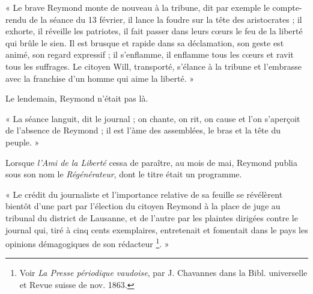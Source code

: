 \documentclass[french,twoside]{book} %
\newenvironment{quoteblock}%
  {\begin{quoting}}
  {\end{quoting}}
\newenvironment{quotebar}{%
    \def\FrameCommand{{\color{rubric!10!}\vrule width 0.5em} \hspace{0.9em}}%
    \def\OuterFrameSep{\itemsep} %
    \MakeFramed {\advance\hsize-\width \FrameRestore}
  }%
  {%
    \endMakeFramed
  }
\renewenvironment{quoteblock}%
  {%
    \savenotes
    \setstretch{0.9}
    \begin{quotebar}
  }
  {%
    \end{quotebar}
    \spewnotes
  }
\begin{document}
\begin{quoteblock}
\noindent « Le brave Reymond monte de nouveau à la tribune, dit par exemple le compte-rendu de la séance du 13 février, il lance la foudre sur la tête des aristocrates ; il exhorte, il réveille les patriotes, il fait passer dans leurs cœurs le feu de la liberté qui brûle le sien. Il est brusque et rapide dans sa déclamation, son geste est animé, son regard expressif ; il s’enflamme, il enflamme tous les cœurs et ravit tous les suffrages. Le citoyen Will, transporté, s’élance à la tribune et l’embrasse avec la franchise d’un homme qui aime la liberté. »\end{quoteblock}

\noindent Le lendemain, Reymond n’était pas là.\par

\begin{quoteblock}
\noindent « La séance languit, dit le journal ; on chante, on rit, on cause et l’on s’aperçoit de l’absence de Reymond ; il est l’àme des assemblées, le bras et la tête du peuple. »\end{quoteblock}

\noindent Lorsque \emph{l’Ami de la Liberté} cessa de paraître, au mois de mai, Reymond publia sous son nom le \emph{Régénérateur}, dont le titre était un programme.\par

\begin{quoteblock}
\noindent « Le crédit du journaliste et l’importance relative de sa feuille se révélèrent bientôt d’une part par l’élection du citoyen Reymond à la place de juge au tribunal du district de Lausanne, et de l’autre par les plaintes dirigées contre le journal qui, tiré à cinq cents exemplaires, entretenait et fomentait dans le pays les opinions démagogiques de son rédacteur \footnote{Voir \emph{La Presse périodique vaudoise}, par J. Chavannes dans la Bibl. universelle et Revue suisse de nov. 1863.}. »\end{quoteblock}
\end{document}

